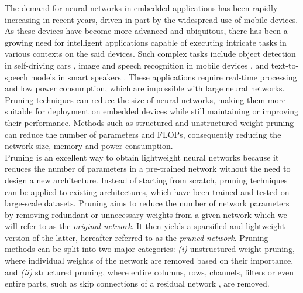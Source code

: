 The demand for neural networks in embedded applications has been rapidly
increasing in recent years, driven in part by the widespread use of mobile
devices. As these devices have become more advanced and ubiquitous, there has
been a growing need for intelligent applications capable of executing intricate
tasks in various contexts on the said devices. Such complex tasks include object
detection in self-driving cars
\cite{howard2017mobilenets,DBLP:conf/icml/TanL19,DBLP:conf/cvpr/RedmonDGF16,DBLP:conf/nips/RenHGS15,kuutti2020survey},
image and speech recognition in mobile devices
\cite{kim2020review,mcgraw2016personalized}, and text-to-speech models in smart
speakers \cite{arik2017deep,ren2019fastspeech}. These applications require
real-time processing and low power consumption, which are impossible with large
neural networks. Pruning techniques can reduce the size of neural networks,
making them more suitable for deployment on embedded devices while still
maintaining or improving their performance. Methods such as structured
\cite{DBLP:conf/iclr/0022KDSG17,DBLP:conf/iccv/LiuLSHYZ17} and unstructured
weight pruning
\cite{DBLP:conf/nips/CunDS89,DBLP:conf/iclr/FrankleC19,DBLP:conf/nips/HanPTD15}
can reduce the number of parameters and \acp{FLOP}, consequently reducing the
network size, memory and power consumption.\\

Pruning is an excellent way to obtain lightweight neural networks because it
reduces the number of parameters in a pre-trained network without the need to
design a new architecture. Instead of starting from scratch, pruning techniques
can be applied to existing architectures, which have been trained and tested on
large-scale datasets. Pruning aims to reduce the number of network parameters by
removing redundant or unnecessary weights from a given network which we will
refer to as the \textit{original network}. It then yields a sparsified and
lightweight version of the latter, hereafter referred to as the \textit{pruned
  network}. Pruning methods can be split into two major categories: \textit{(i)}
unstructured weight pruning, where individual weights of the network are removed
based on their importance, and \textit{(ii)} structured pruning, where entire
columns, rows, channels, filters or even entire parts, such as skip connections
of a residual network \cite{DBLP:conf/cvpr/HeZRS16}, are removed. \\


